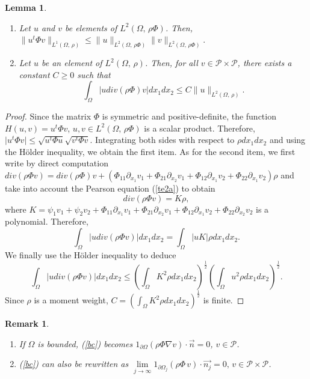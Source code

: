 \documentclass[11pt]{article}
\newtheorem{remark}[theorem]{Remark}
\newtheorem{lemma}[theorem]{Lemma}
\begin{document}
	{\begin{lemma}\label{inlem} \hspace{1cm}\\
			\begin{enumerate}
				\item Let  $u$ and $v$ be elements of $L^2(\Omega,\,\rho\Phi)$. Then, $\|u^t\Phi v\|_{L^1(\Omega,\,\rho)}\leq \|u\|_{L^2(\Omega,\,\rho\Phi)}\|v\|_{L^2(\Omega,\,\rho\Phi)}.$ 
				\item Let $u$ be an element of $L^2(\Omega,\,\rho)$. Then, for all $v\in\mathcal{P}\times\mathcal{P}$, there exists a constant $C\geq 0$ such that  $$\int_{\Omega}|u div(\rho\Phi )v|dx_1dx_2\leq C \| u\|_{L^2(\Omega,\,\rho)}.$$
			\end{enumerate}
		\end{lemma}
		\begin{proof}
			Since the matrix $\Phi$ is symmetric and positive-definite, the function $H(u,v) =u^t\Phi v$, $u,v\in L^2(\Omega,\,\rho\Phi)$ is a scalar product. Therefore, $\vert u^t\Phi v\rvert \leq \sqrt{u^t\Phi u}\sqrt{v^t\Phi v}$. Integrating both sides with respect to $\rho dx_1dx_2$ and using the H\"older inequality, we obtain the first item.
			As for the second item, we first write by direct computation 
			$div(\rho\Phi v)=div(\rho\Phi)v+\left(\Phi_{11}\partial_{x_1}v_1+\Phi_{21}\partial_{x_2}v_1+\Phi_{12}\partial_{x_1}v_2+\Phi_{22}\partial_{x_1}v_2\right)\rho$ and take into account the Pearson equation (\ref{te2a}) to obtain
			\begin{equation}\label{div2}
				div(\rho\Phi v)=K\rho,
			\end{equation} where $K=\psi_{1}v_1+\psi_2v_2+\Phi_{11}\partial_{x_1}v_1+\Phi_{21}\partial_{x_2}v_1+\Phi_{12}\partial_{x_1}v_2+\Phi_{22}\partial_{x_2}v_2$ is a polynomial. Therefore,
			$$\int_{\Omega}|udiv(\rho\Phi v)| dx_1dx_2=\int_{\Omega}|uK|\rho dx_1dx_2.$$ We finally use the H\"older inequality to deduce $$\int_{\Omega}|udiv(\rho\Phi v)| dx_1dx_2\leq \left(\int_{\Omega}K^2\rho dx_1dx_2\right)^{\tfrac{1}{2}}\left(\int_{\Omega}u^2\rho dx_1dx_2\right)^{\tfrac{1}{2}}.$$ Since $\rho$ is a moment weight, $C=\left(\int_{\Omega}K^2\rho dx_1dx_2\right)^{\tfrac{1}{2}}$ is finite.
		\end{proof}
	}
	\begin{remark}\label{bcremark}\hspace{1 cm}\\
		\begin{enumerate}
			\item If $\Omega$ is bounded, (\ref{bc}) becomes $1_{\partial\Omega}\left(\rho\Phi\nabla v\right)\cdot\overrightarrow{n}=0$, $v\in\mathcal{P}$.
			\item (\ref{bc}) can also be rewritten as 	$\lim\limits_{j\rightarrow\infty}1_{\partial\Omega_j}\left(\rho \Phi\,v\right)\cdot\overrightarrow{n_j}=0,\, v\in\mathcal{P}\times\mathcal{P}$.
		\end{enumerate}
	\end{remark}
	
\end{document}
